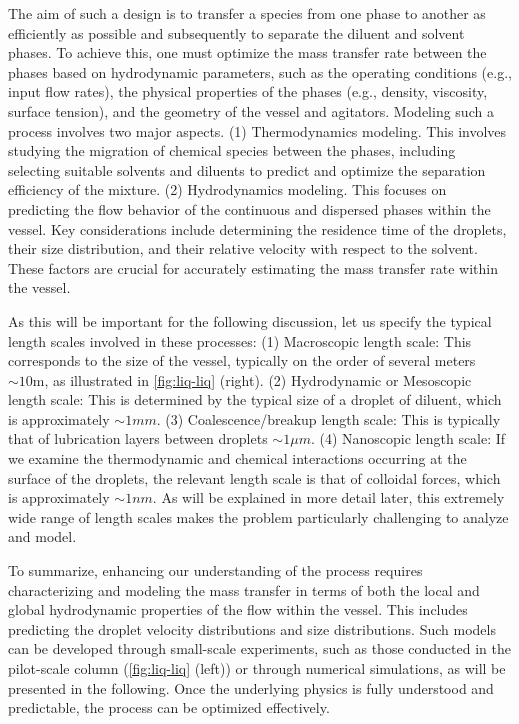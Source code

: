 The aim of such a design is to transfer a species from one phase to another as efficiently as possible and subsequently to separate the diluent and solvent phases.
To achieve this, one must optimize the mass transfer rate between the phases based on hydrodynamic parameters, such as the operating conditions (e.g., input flow rates), the physical properties of the phases (e.g., density, viscosity, surface tension), and the geometry of the vessel and agitators.
Modeling such a process involves two major aspects.
(1) Thermodynamics modeling. This involves studying the migration of chemical species between the phases, including selecting suitable solvents and diluents to predict and optimize the separation efficiency of the mixture.
(2) Hydrodynamics modeling. This focuses on predicting the flow behavior of the continuous and dispersed phases within the vessel. Key considerations include determining the residence time of the droplets, their size distribution, and their relative velocity with respect to the solvent. These factors are crucial for accurately estimating the mass transfer rate within the vessel.



As this will be important for the following discussion, let us specify the typical length scales involved in these processes:
(1) Macroscopic length scale: This corresponds to the size of the vessel, typically on the order of several meters $\sim 10 \text{m}$, as illustrated in \ref{fig:liq-liq} (right). 
(2) Hydrodynamic or Mesoscopic length scale: This is determined by the typical size of a droplet of diluent, which is approximately $\sim 1 mm$. 
(3) Coalescence/breakup length scale: This is typically that of lubrication layers between droplets $\sim 1 \mu m$. 
(4) Nanoscopic length scale: If we examine the thermodynamic and chemical interactions occurring at the surface of the droplets, the relevant length scale is that of colloidal forces, which is approximately $\sim 1 nm$. 
As will be explained in more detail later, this extremely wide range of length scales makes the problem particularly challenging to analyze and model. 

To summarize, enhancing our understanding of the process requires characterizing and modeling the mass transfer in terms of both the local and global hydrodynamic properties of the flow within the vessel. 
This includes predicting the droplet velocity distributions and size distributions. 
Such models can be developed through small-scale experiments, such as those conducted in the pilot-scale column (\ref{fig:liq-liq} (left)) or through numerical simulations, as will be presented in the following. 
Once the underlying physics is fully understood and predictable, the process can be optimized effectively.


